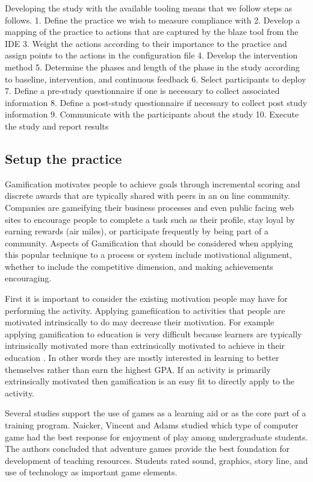\documentclass{sig-alternate}
\begin{document}
Developing the study with the available tooling means that we follow steps as follows.
1. Define the practice we wish to measure compliance with
2. Develop a mapping of the practice to actions that are captured by the blaze tool from the IDE
3. Weight the actions according to their importance to the practice and assign points to the actions in the configuration file
4. Develop the intervention method
5. Determine the phases and length of the phase in the study according to baseline, intervention, and continuous feedback
6. Select participants to deploy
7. Define a pre-study questionnaire if one is necessary to collect associated information
8. Define a post-study questionnaire if necessary to collect post study information
9. Communicate with the participants about the study
10. Execute the study and report results

\subsection{Setup the practice}

Gamification motivates people to achieve goals through incremental scoring and discrete awards that are typically shared with peers in an on line community.  Companies are gameifying their business processes and even public facing web sites to encourage people to complete a task such as their profile, stay loyal by earning rewards (air miles), or participate frequently by being part of a community.  Aspects of Gamification that should be considered when applying this popular technique to a process or system include motivational alignment, whether to include the competitive dimension, and making achievements encouraging.  

First it is important to consider the existing motivation people may have for performing the activity.  Applying gamefiication to activities that people are motivated intrinsically to do may decrease their motivation.  For example applying gamification to education is very difficult because learners are typically intrinsically motivated more than extrinsically motivated to achieve in their education \cite{wbsnipes:Vansteenkiste2008Does}.    In other words they are mostly interested in learning to better themselves rather than earn the highest GPA.   If an activity is primarily extrinsically motivated then gamification is an easy fit to directly apply to the activity.

Several studies support the use of games as a learning aid or as the core part of a training program.  Naicker, Vincent and Adams \cite{wbsnipes:Amory1999Use} studied which type of computer game had the best response for enjoyment of play among undergraduate students.  The authors concluded that adventure games provide the best foundation for development of teaching resources.  Students rated sound, graphics, story line, and use of technology as important game elements.
\end{document}
